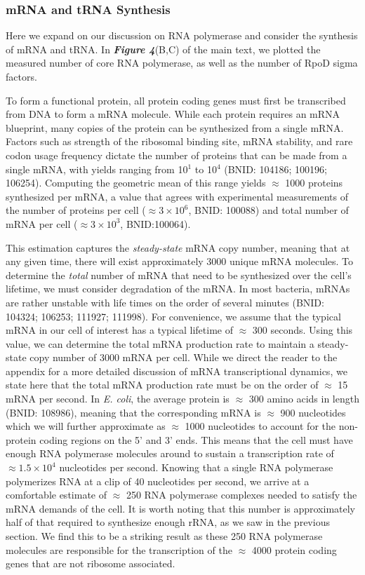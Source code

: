 \subsubsection{mRNA and tRNA Synthesis}
Here we expand on our discussion on RNA polymerase and consider the synthesis of
mRNA and tRNA. In \textbf{\textit{Figure 4}}(B,C) of the main text, we plotted
the measured  number of core RNA polymerase, as well as the number of RpoD sigma
factors.

To form a functional protein, all protein coding genes must first be
transcribed from DNA to form a mRNA molecule. While each protein requires an
mRNA blueprint, many copies of the protein can be synthesized from a single
mRNA. Factors such as strength of the ribosomal binding site, mRNA stability,
and rare codon usage frequency dictate the number of proteins that can be
made from a single mRNA, with yields ranging from 10$^1$ to 10$^4$ (BNID:
104186; 100196; 106254). Computing the geometric mean of this range yields
$\approx$ 1000 proteins synthesized per mRNA, a value that agrees with
experimental measurements of the number of proteins per cell ($\approx 3
\times 10^6$, BNID: 100088) and total number of mRNA per cell ($\approx 3
\times 10^3$, BNID:100064).

This estimation captures the \textit{steady-state} mRNA copy number, meaning
that at any given time, there will exist approximately 3000 unique mRNA
molecules. To determine the \textit{total} number of mRNA that need to be
synthesized over the cell's lifetime, we must consider degradation of the
mRNA. In most bacteria, mRNAs are rather unstable with life times on the
order of several minutes (BNID: 104324; 106253; 111927; 111998). For
convenience, we assume that the typical mRNA in our cell of interest has a
typical lifetime of $\approx$ 300 seconds. Using this value, we can determine
the total mRNA production rate to maintain a steady-state copy number of 3000
mRNA per cell. While we direct the reader to the appendix for a more detailed
discussion of mRNA transcriptional dynamics, we state here that the total
mRNA production rate must be on the order of $\approx$ 15 mRNA per second. In
\textit{E. coli}, the average protein is $\approx$ 300 amino acids in length
(BNID: 108986), meaning that the corresponding mRNA is $\approx$ 900
nucleotides which we will further approximate as $\approx$ 1000 nucleotides
to account for the non-protein coding regions on the 5' and 3' ends. This
means that the cell must have enough RNA polymerase molecules around to
sustain a transcription rate of $\approx 1.5 \times 10^4$ nucleotides per
second. Knowing that a single RNA polymerase polymerizes RNA at a clip of 40
nucleotides per second, we arrive at a comfortable estimate of $\approx$ 250
RNA polymerase complexes needed to satisfy the mRNA demands of the cell. It
is worth noting that this number is approximately half of that required to
synthesize enough rRNA, as we saw in the previous section. We find this to be
a striking result as these 250 RNA polymerase molecules are responsible for
the transcription of the $\approx$ 4000 protein coding genes that are not
ribosome associated.

